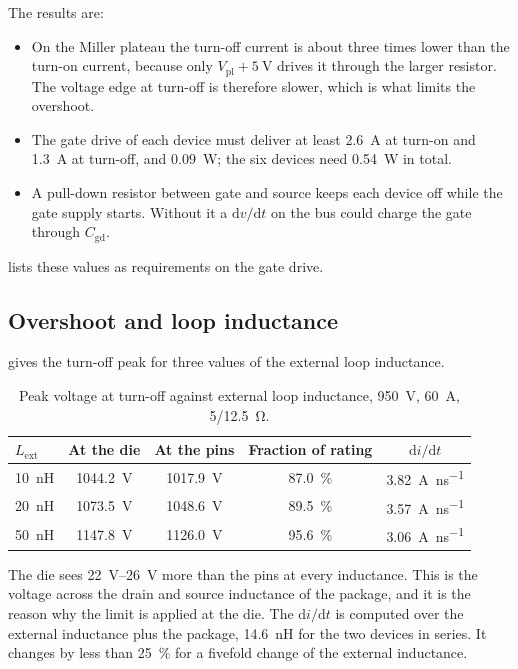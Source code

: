 The results are:
\begin{itemize}
  \item On the Miller plateau the turn-off current is about three times
        lower than the turn-on current, because only $V_\mathrm{pl} + \SI{5}{\volt}$
        drives it through the larger resistor. The voltage edge at turn-off
        is therefore slower, which is what limits the overshoot.
  \item The gate drive of each device must deliver at least
        \SI{2.6}{\ampere} at turn-on and \SI{1.3}{\ampere} at turn-off, and
        \SI{0.09}{\watt}; the six devices need \SI{0.54}{\watt} in total.
  \item A pull-down resistor between gate and source keeps each device off
        while the gate supply starts. Without it a $\mathrm{d}v/\mathrm{d}t$ on
        the bus could charge the gate through $C_\mathrm{gd}$.
\end{itemize}
 lists these values as requirements on the gate drive.

\subsection{Overshoot and loop inductance}

 gives the turn-off peak for three values of the
external loop inductance.

\begin{table}[H]
\centering
\caption{Peak voltage at turn-off against external loop inductance,
\SI{950}{\volt}, \SI{60}{\ampere}, \SI{5}{}/\SI{12.5}{\ohm}.}
\label{tab:overshoot}
\zebra
\begin{tabular}{lcccc}
\toprule
$L_\mathrm{ext}$ & At the die & At the pins & Fraction of rating & $\mathrm{d}i/\mathrm{d}t$ \\
\midrule
\SI{10}{\nano\henry} & \SI{1044.2}{\volt} & \SI{1017.9}{\volt} & \SI{87.0}{\percent} & \SI{3.82}{\ampere\per\nano\second} \\
\SI{20}{\nano\henry} & \SI{1073.5}{\volt} & \SI{1048.6}{\volt} & \SI{89.5}{\percent} & \SI{3.57}{\ampere\per\nano\second} \\
\SI{50}{\nano\henry} & \SI{1147.8}{\volt} & \SI{1126.0}{\volt} & \SI{95.6}{\percent} & \SI{3.06}{\ampere\per\nano\second} \\
\bottomrule
\end{tabular}
\end{table}

The die sees \SIrange{22}{26}{\volt} more than the pins at every
inductance. This is the voltage across the drain and source inductance of the
package, and it is the reason why the limit is applied at the die. The
$\mathrm{d}i/\mathrm{d}t$ is computed over the external inductance plus the
package, \SI{14.6}{\nano\henry} for the two devices in series. It changes by
less than \SI{25}{\percent} for a fivefold change of the external inductance.

